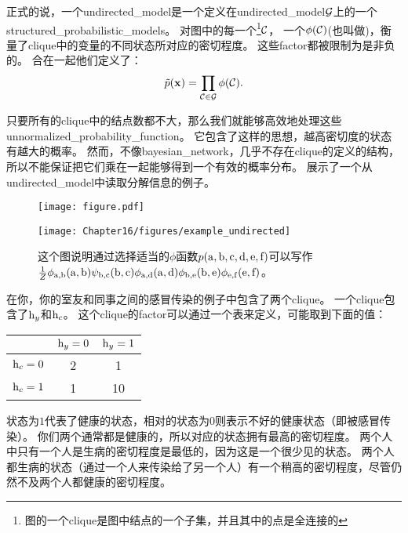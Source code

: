 正式的说，一个\gls{undirected_model}是一个定义在\gls{undirected_model}$\mathcal{G}$上的一个\gls{structured_probabilistic_models}。
对图中的每一个\footnote{图的一个\gls{clique}是图中结点的一个子集，并且其中的点是全连接的}$\mathcal{C}$，
一个$\phi(\mathcal{C})$(也叫做)，衡量了\gls{clique}中的变量的不同状态所对应的密切程度。
这些\gls{factor}都被限制为是非负的。
合在一起他们定义了：
\begin{align}
\label{eqn:163}
\tilde{p}(\mathbf{x}) = \prod_{\mathcal{C}\in\mathcal{G}} \phi(\mathcal{C}).
\end{align}


只要所有的\gls{clique}中的结点数都不大，那么我们就能够高效地处理这些\gls{unnormalized_probability_function}。
它包含了这样的思想，越高密切度的状态有越大的概率。
然而，不像\gls{bayesian_network}，几乎不存在\gls{clique}的定义的结构，所以不能保证把它们乘在一起能够得到一个有效的概率分布。
展示了一个从\gls{undirected_model}中读取分解信息的例子。

\begin{figure}[!htb]
\ifOpenSource
\centerline{\texttt{[image: figure.pdf]}}
\else
	\centerline{\texttt{[image: Chapter16/figures/example\_undirected]}}
\fi
	\caption{这个图说明通过选择适当的$\phi$函数$p(\mathrm{a},\mathrm{b},\mathrm{c},\mathrm{d},\mathrm{e},\mathrm{f})$可以写作$\frac{1}{Z}\phi_{\mathrm{a},\mathrm{b}}(\mathrm{a},\mathrm{b})\psi_{\mathrm{b},\mathrm{c}}(\mathrm{b},\mathrm{c})\phi_{\mathrm{a},\mathrm{d}}(\mathrm{a},\mathrm{d})\phi_{\mathrm{b},\mathrm{e}}(\mathrm{b},\mathrm{e})\phi_{\mathrm{e},\mathrm{f}}(\mathrm{e},\mathrm{f})$。}
	\label{fig:example_undirected}
\end{figure}



在你，你的室友和同事之间的感冒传染的例子中包含了两个\gls{clique}。
一个\gls{clique}包含了$\mathrm{h}_y$和$\mathrm{h}_c$。
这个\gls{clique}的\gls{factor}可以通过一个表来定义，可能取到下面的值：

\begin{tabular}{c|cc}
		& $\mathrm{h}_y = 0$ & $\mathrm{h}_y = 1$ \\ \hline
		$\mathrm{h}_c = 0$ & 2 & 1 \\
		$\mathrm{h}_c = 1$  & 1 & 10 \\
\end{tabular}


状态为$1$代表了健康的状态，相对的状态为$0$则表示不好的健康状态（即被感冒传染）。
你们两个通常都是健康的，所以对应的状态拥有最高的密切程度。
两个人中只有一个人是生病的密切程度是最低的，因为这是一个很少见的状态。
两个人都生病的状态（通过一个人来传染给了另一个人）有一个稍高的密切程度，尽管仍然不及两个人都健康的密切程度。


